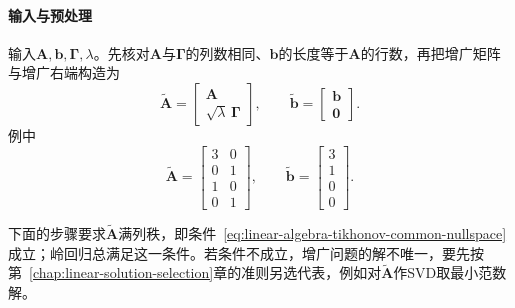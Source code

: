 \paragraph{输入与预处理}
输入$\bm A,\bm b,\bm\Gamma,\lambda$。先核对$\bm A$与$\bm\Gamma$的列数相同、$\bm b$的长度等于$\bm A$的行数，再把增广矩阵与增广右端构造为
\[
 \tilde{\bm A}=\begin{bmatrix}\bm A\\ \sqrt\lambda\,\bm\Gamma\end{bmatrix},\qquad
 \tilde{\bm b}=\begin{bmatrix}\bm b\\ \bm0\end{bmatrix}.
\]
例中
\[
 \tilde{\bm A}=\begin{bmatrix}3&0\\0&1\\1&0\\0&1\end{bmatrix},\qquad
 \tilde{\bm b}=\begin{bmatrix}3\\1\\0\\0\end{bmatrix}.
\]

下面的步骤要求$\tilde{\bm A}$满列秩，即条件~\eqref{eq:linear-algebra-tikhonov-common-nullspace}成立；岭回归总满足这一条件。若条件不成立，增广问题的解不唯一，要先按第~\ref{chap:linear-solution-selection}章的准则另选代表，例如对$\tilde{\bm A}$作SVD取最小范数解。

